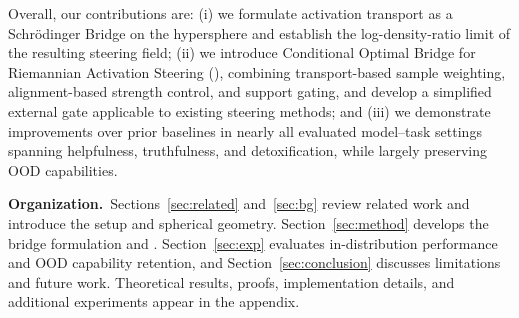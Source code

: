 Overall, our contributions are: (i) we formulate activation transport as a Schr\"{o}dinger Bridge on the hypersphere and establish the log-density-ratio limit of the resulting steering field; (ii) we introduce Conditional Optimal Bridge for Riemannian Activation Steering (\Cobras), combining transport-based sample weighting, alignment-based strength control, and support gating, and develop a simplified external gate applicable to existing steering methods; and (iii) we demonstrate improvements over prior baselines in nearly all evaluated model--task settings spanning helpfulness, truthfulness, and detoxification, while largely preserving OOD capabilities.

\noindent\textbf{Organization.}~Sections~\ref{sec:related} and~\ref{sec:bg} review related work and introduce the setup and spherical geometry. Section~\ref{sec:method} develops the bridge formulation and \Cobras. Section~\ref{sec:exp} evaluates in-distribution performance and OOD capability retention, and Section~\ref{sec:conclusion} discusses limitations and future work. Theoretical results, proofs, implementation details, and additional experiments appear in the appendix.
